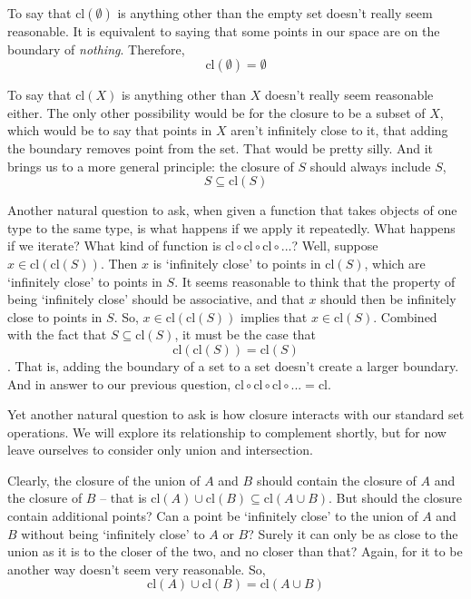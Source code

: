 \documentclass{report}
\newcommand{\cl}{\mathrm{cl}}
\begin{document}
To say that $\cl(∅)$ is anything other than the empty set doesn't really seem reasonable. It is equivalent to saying that some points in our space are on the boundary of \emph{nothing}. Therefore, 
\begin{equation}
\cl(∅) = ∅ \tag{Closure 1}
\end{equation}

To say that $\cl(X)$ is anything other than $X$ doesn't really seem reasonable either. The only other possibility would be for the closure to be a subset of $X$, which would be to say that points in $X$ aren't infinitely close to it, that adding the boundary removes point from the set. That would be pretty silly. And it brings us to a more general principle: the closure of $S$ should always include $S$,
\begin{equation}
S ⊆ \cl(S) \tag{Closure 2}
\end{equation}

Another natural question to ask, when given a function that takes objects of one type to the same type, is what happens if we apply it repeatedly. What happens if we iterate? What kind of function is $\cl ∘ \cl ∘ \cl ∘ ...$? Well, suppose $x ∈ \cl(\cl(S))$. Then $x$ is `infinitely close' to points in $\cl(S)$, which are `infinitely close' to points in $S$. It seems reasonable to think that the property of being `infinitely close' should be associative, and that $x$ should then be infinitely close to points in $S$. So, $x ∈ \cl(\cl(S))$ implies that $x ∈ \cl(S)$. Combined with the fact that $S ⊆ \cl(S)$, it must be the case that 
\begin{equation}
\cl(\cl(S)) = \cl(S) \tag{Closure 3}
\end{equation}
. That is, adding the boundary of a set to a set doesn't create a larger boundary. And in answer to our previous question, $\cl ∘ \cl ∘ \cl ∘ ... = \cl$.

Yet another natural question to ask is how closure interacts with our standard set operations. We will explore its relationship to complement shortly, but for now leave ourselves to consider only union and intersection.

Clearly, the closure of the union of $A$ and $B$ should contain the closure of $A$ and the closure of $B$ -- that is $\cl(A)∪\cl(B) ⊆ \cl(A∪B)$. But should the closure contain additional points? Can a point be `infinitely close' to the union of $A$ and $B$ without being `infinitely close' to $A$ or $B$? Surely it can only be as close to the union as it is to the closer of the two, and no closer than that? Again, for it to be another way doesn't seem very reasonable. So, 
\begin{equation}
\cl(A)∪\cl(B) = \cl(A∪B) \tag{Closure 4}
\end{equation}
\end{document}
